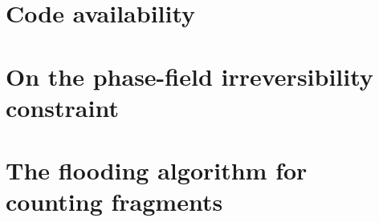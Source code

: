 \chapter{Code availability}
\label{appendix: code}

\chapter{On the phase-field irreversibility constraint}
\label{appendix: irreversibility}

\chapter{The flooding algorithm for counting fragments}
\label{appendix: flooding}
